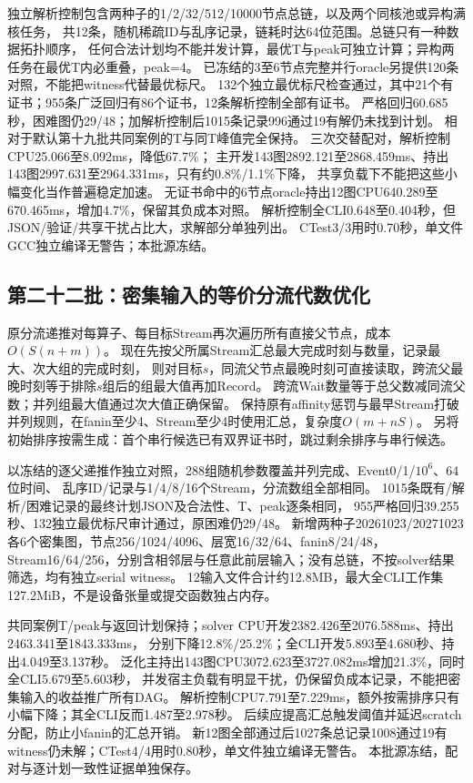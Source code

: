 \documentclass[UTF8,a4paper,11pt,fontset=fandol]{ctexart}
\begin{document}
独立解析控制包含两种子的1/2/32/512/10000节点总链，以及两个同核池或异构满核任务，
共12条，随机稀疏ID与乱序记录，链耗时达64位范围。总链只有一种数据拓扑顺序，
任何合法计划均不能并发计算，最优T与peak可独立计算；异构两任务在最优T内必重叠，peak=4。
已冻结的3至6节点完整并行oracle另提供120条对照，不能把witness代替最优标尺。
132个独立最优标尺检查通过，其中21个有证书；955条广泛回归有86个证书，12条解析控制全部有证书。
严格回归60.685秒，困难图仍29/48；加解析控制后1015条记录996通过19有解仍未找到计划。
相对于默认第十九批共同案例的T与同T峰值完全保持。
三次交替配对，解析控制CPU25.066至8.092ms，降低67.7\%；
主开发143图2892.121至2868.459ms、持出143图2997.631至2964.331ms，只有约0.8\%/1.1\%下降，
共享负载下不能把这些小幅变化当作普遍稳定加速。
无证书命中的6节点oracle持出12图CPU640.289至670.465ms，增加4.7\%，保留其负成本对照。
解析控制全CLI0.648至0.404秒，但JSON/验证/共享干扰占比大，求解部分单独列出。
CTest3/3用时0.70秒，单文件GCC独立编译无警告；本批源冻结。

\subsection{第二十二批：密集输入的等价分流代数优化}
原分流递推对每算子、每目标Stream再次遍历所有直接父节点，成本$O(S(n+m))$。
现在先按父所属Stream汇总最大完成时刻与数量，记录最大、次大组的完成时刻，
则对目标$s$，同流父节点最晚时刻可直接读取，跨流父最晚时刻等于排除$s$组后的组最大值再加Record。
跨流Wait数量等于总父数减同流父数；并列组最大值通过次大值正确保留。
保持原有affinity惩罚与最早Stream打破并列规则，在fanin至少4、Stream至少4时使用汇总，复杂度$O(m+nS)$。
另将初始排序按需生成：首个串行候选已有双界证书时，跳过剩余排序与串行候选。

以冻结的逐父递推作独立对照，288组随机参数覆盖并列完成、Event0/1/$10^6$、64位时间、
乱序ID/记录与1/4/8/16个Stream，分流数组全部相同。
1015条既有/解析/困难记录的最终计划JSON及合法性、T、peak逐条相同，
955严格回归39.255秒、132独立最优标尺审计通过，原困难仍29/48。
新增两种子20261023/20271023各6个密集图，节点256/1024/4096、层宽16/32/64、fanin8/24/48，
Stream16/64/256，分别含相邻层与任意此前层输入；没有总链，不按solver结果筛选，均有独立serial witness。
12输入文件合计约12.8MB，最大全CLI工作集127.2MiB，不是设备张量或提交函数独占内存。

共同案例T/peak与返回计划保持；solver CPU开发2382.426至2076.588ms、持出2463.341至1843.333ms，
分别下降12.8\%/25.2\%；全CLI开发5.893至4.680秒、持出4.049至3.137秒。
泛化主持出143图CPU3072.623至3727.082ms增加21.3\%，同时全CLI5.679至5.603秒，
并发宿主负载有明显干扰，仍保留负成本记录，不能把密集输入的收益推广所有DAG。
解析控制CPU7.791至7.229ms，额外按需排序只有小幅下降；其全CLI反而1.487至2.978秒。
后续应提高汇总触发阈值并延迟scratch分配，防止小fanin的汇总开销。
新12图全部通过后1027条总记录1008通过19有witness仍未解；CTest4/4用时0.80秒，单文件独立编译无警告。
本批源冻结，配对与逐计划一致性证据单独保存。
\end{document}
